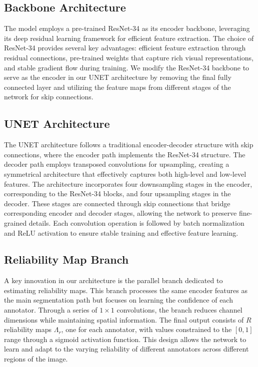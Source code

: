 \subsection{Backbone Architecture}

The model employs a pre-trained ResNet-34 as its encoder backbone,
leveraging its deep residual learning framework for efficient feature
extraction. The choice of ResNet-34 provides several key advantages:
efficient feature extraction through residual connections,
pre-trained weights that capture rich visual representations, and
stable gradient flow during training. We modify the ResNet-34
backbone to serve as the encoder in our UNET architecture by removing
the final fully connected layer and utilizing the feature maps from
different stages of the network for skip connections.

\subsection{UNET Architecture}

The UNET architecture follows a traditional encoder-decoder structure
with skip connections, where the encoder path implements the
ResNet-34 structure. The decoder path employs transposed convolutions
for upsampling, creating a symmetrical architecture that effectively
captures both high-level and low-level features. The architecture
incorporates four downsampling stages in the encoder, corresponding
to the ResNet-34 blocks, and four upsampling stages in the decoder.
These stages are connected through skip connections that bridge
corresponding encoder and decoder stages, allowing the network to
preserve fine-grained details. Each convolution operation is followed
by batch normalization and ReLU activation to ensure stable training
and effective feature learning.

\subsection{Reliability Map Branch}

A key innovation in our architecture is the parallel branch dedicated
to estimating reliability maps. This branch processes the same
encoder features as the main segmentation path but focuses on
learning the confidence of each annotator. Through a series of $1
\times 1$ convolutions, the branch reduces channel dimensions while
maintaining spatial information. The final output consists of $R$
reliability maps $\Lambda_r$, one for each annotator, with values
constrained to the $[0,1]$ range through a sigmoid activation
function. This design allows the network to learn and adapt to the
varying reliability of different annotators across different regions
of the image.

